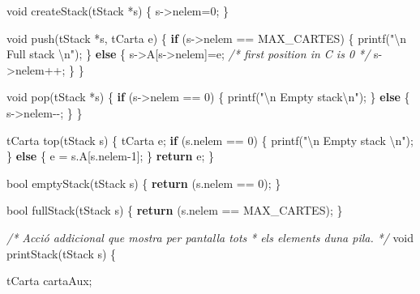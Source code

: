\documentclass[]{book}
\newenvironment{Shaded}{\begin{snugshade}}{\end{snugshade}}
\newcommand{\CommentTok}[1]{\textcolor[rgb]{0.56,0.35,0.01}{\textit{#1}}}
\newcommand{\ControlFlowTok}[1]{\textcolor[rgb]{0.13,0.29,0.53}{\textbf{#1}}}
\newcommand{\DataTypeTok}[1]{\textcolor[rgb]{0.13,0.29,0.53}{#1}}
\newcommand{\DecValTok}[1]{\textcolor[rgb]{0.00,0.00,0.81}{#1}}
\newcommand{\NormalTok}[1]{#1}
\newcommand{\SpecialCharTok}[1]{\textcolor[rgb]{0.00,0.00,0.00}{#1}}
\newcommand{\StringTok}[1]{\textcolor[rgb]{0.31,0.60,0.02}{#1}}
\begin{document}
\begin{Shaded}
\begin{Highlighting}[]
\DataTypeTok{void}\NormalTok{ createStack(tStack *s) \{}
\NormalTok{    s{-}\textgreater{}nelem=}\DecValTok{0}\NormalTok{;}
\NormalTok{\}}

\DataTypeTok{void}\NormalTok{ push(tStack *s, tCarta e) \{}
    \ControlFlowTok{if}\NormalTok{ (s{-}\textgreater{}nelem == MAX\_CARTES) \{}
\NormalTok{        printf(}\StringTok{"}\SpecialCharTok{\textbackslash{}n}\StringTok{ Full stack }\SpecialCharTok{\textbackslash{}n}\StringTok{"}\NormalTok{);}
\NormalTok{    \} }\ControlFlowTok{else}\NormalTok{ \{}
\NormalTok{        s{-}\textgreater{}A[s{-}\textgreater{}nelem]=e; }\CommentTok{/* first position in C is 0 */}
\NormalTok{        s{-}\textgreater{}nelem++;}
\NormalTok{    \}}
\NormalTok{\}}

\DataTypeTok{void}\NormalTok{ pop(tStack *s) \{}
    \ControlFlowTok{if}\NormalTok{ (s{-}\textgreater{}nelem == }\DecValTok{0}\NormalTok{) \{}
\NormalTok{        printf(}\StringTok{"}\SpecialCharTok{\textbackslash{}n}\StringTok{ Empty stack}\SpecialCharTok{\textbackslash{}n}\StringTok{"}\NormalTok{);}
\NormalTok{    \} }\ControlFlowTok{else}\NormalTok{ \{}
\NormalTok{        s{-}\textgreater{}nelem{-}{-};}
\NormalTok{    \}}
\NormalTok{\}}

\NormalTok{tCarta top(tStack s) \{}
\NormalTok{    tCarta e;}
    \ControlFlowTok{if}\NormalTok{ (s.nelem == }\DecValTok{0}\NormalTok{) \{}
\NormalTok{        printf(}\StringTok{"}\SpecialCharTok{\textbackslash{}n}\StringTok{ Empty stack }\SpecialCharTok{\textbackslash{}n}\StringTok{"}\NormalTok{);}
\NormalTok{    \} }\ControlFlowTok{else}\NormalTok{ \{}
\NormalTok{        e = s.A[s.nelem{-}}\DecValTok{1}\NormalTok{];}
\NormalTok{    \}}
    \ControlFlowTok{return}\NormalTok{ e;}
\NormalTok{\}}

\DataTypeTok{bool}\NormalTok{ emptyStack(tStack s) \{}
    \ControlFlowTok{return}\NormalTok{ (s.nelem == }\DecValTok{0}\NormalTok{);}
\NormalTok{\}}

\DataTypeTok{bool}\NormalTok{ fullStack(tStack s) \{}
    \ControlFlowTok{return}\NormalTok{ (s.nelem == MAX\_CARTES);}
\NormalTok{\}}

\CommentTok{/* Acció addicional que mostra per pantalla tots }
\CommentTok{ * els elements d\textquotesingle{}una pila. }
\CommentTok{ */}
\DataTypeTok{void}\NormalTok{ printStack(tStack s) \{}
    
\NormalTok{    tCarta cartaAux;}
    

\end{Highlighting}
\end{Shaded}
\end{document}
